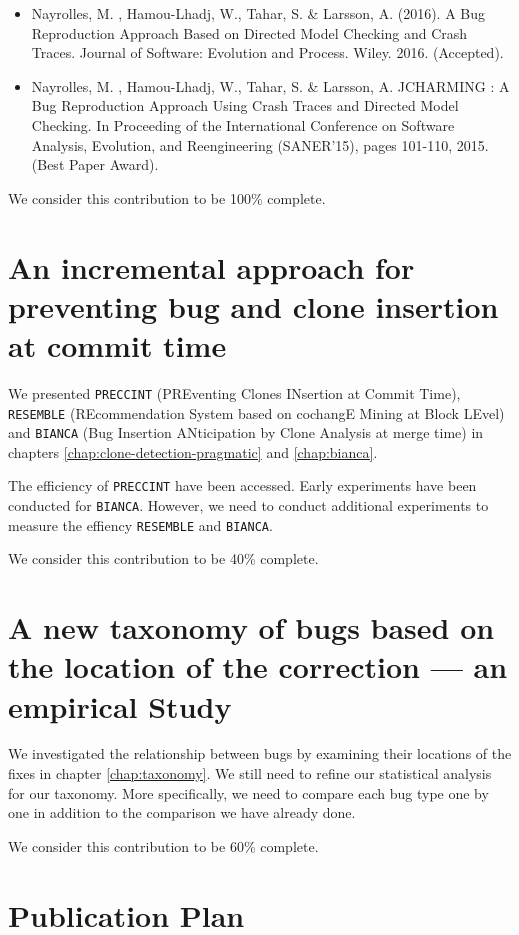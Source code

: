 \begin{itemize}
	\item Nayrolles, M. , Hamou-Lhadj, W., Tahar, S. & Larsson, A. (2016). A Bug Reproduction Approach Based on Directed Model Checking and Crash Traces. Journal of Software: Evolution and Process. Wiley. 2016. (Accepted).
	\item Nayrolles, M. , Hamou-Lhadj, W., Tahar, S. & Larsson, A. JCHARMING : A Bug Reproduction Approach Using Crash Traces and Directed Model Checking. In Proceeding of the International Conference on Software Analysis, Evolution, and Reengineering (SANER'15), pages 101-110, 2015. (Best Paper Award).
\end{itemize}

We consider this contribution to be 100\% complete.

\section{An incremental approach for preventing bug and clone insertion at commit time}

We presented {\tt PRECCINT} (PREventing Clones INsertion at Commit Time), {\tt RESEMBLE} (REcommendation System based on cochangE Mining at Block LEvel) and {\tt BIANCA} (Bug Insertion ANticipation by Clone Analysis at merge time) in chapters \ref{chap:clone-detection-pragmatic} and \ref{chap:bianca}.

The efficiency of {\tt PRECCINT} have been accessed.
Early experiments have been conducted for {\tt BIANCA}.
However, we need to conduct additional experiments to measure the effiency {\tt RESEMBLE} and {\tt BIANCA}.

We consider this contribution to be 40\% complete.

\section{A new taxonomy of bugs based on the location of the correction --- an empirical Study}

We investigated the relationship between bugs by examining their locations of the fixes in chapter \ref{chap:taxonomy}.
We still need to refine our statistical analysis for our taxonomy.
More specifically, we need to compare each bug type one by one in addition to the comparison we have already done.

We consider this contribution to be 60\% complete.

\section{Publication Plan\label{sec:publication-plan}}

